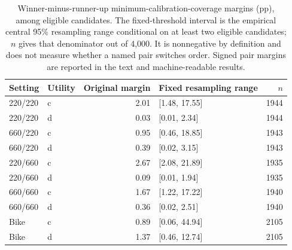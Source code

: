\begin{table}[t]\centering\small
\caption{Winner-minus-runner-up minimum-calibration-coverage margins (pp), among eligible candidates. The fixed-threshold interval is the empirical central 95\% resampling range conditional on at least two eligible candidates; $n$ gives that denominator out of 4,000. It is nonnegative by definition and does not measure whether a named pair switches order. Signed pair margins are reported in the text and machine-readable results.}\label{tab:v7-margins}
\begin{tabular}{llrlr}\toprule
Setting & Utility & Original margin & Fixed resampling range & $n$\\\midrule
220/220 & c & 2.01 & [1.48, 17.55] & 1944 \\
220/220 & d & 0.03 & [0.01, 2.34] & 1944 \\
660/220 & c & 0.95 & [0.46, 18.85] & 1943 \\
660/220 & d & 0.39 & [0.02, 3.15] & 1943 \\
220/660 & c & 2.67 & [2.08, 21.89] & 1935 \\
220/660 & d & 0.09 & [0.01, 1.94] & 1935 \\
660/660 & c & 1.67 & [1.22, 17.22] & 1940 \\
660/660 & d & 0.36 & [0.02, 2.51] & 1940 \\
Bike & c & 0.89 & [0.06, 44.94] & 2105 \\
Bike & d & 1.37 & [0.46, 12.74] & 2105 \\
\bottomrule\end{tabular}\end{table}
